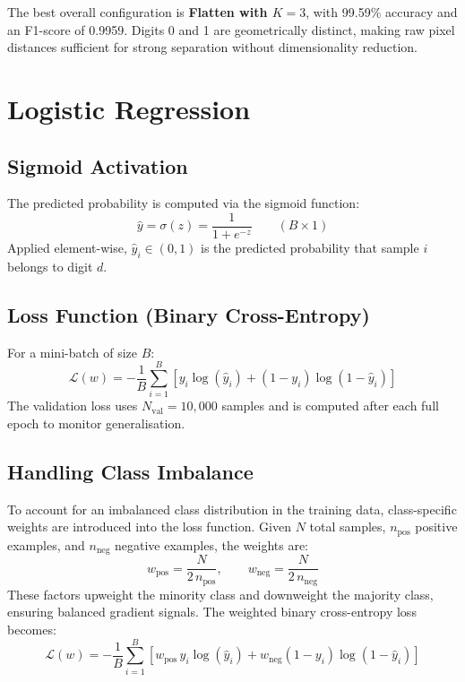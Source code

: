 \documentclass[11pt,a4paper]{article}
\begin{document}
The best overall configuration is \textbf{Flatten with $K=3$}, with 99.59\% accuracy and an F1-score of 0.9959. Digits 0 and 1 are geometrically distinct, making raw pixel distances sufficient for strong separation without dimensionality reduction.

\newpage

\section{Logistic Regression}

\subsection{Sigmoid Activation}

The predicted probability is computed via the sigmoid function:
\[
\hat{y} = \sigma(z) = \frac{1}{1 + e^{-z}} \qquad (B \times 1)
\]
Applied element-wise, $\hat{y}_i \in (0,1)$ is the predicted probability that sample $i$ belongs to digit $d$.

\subsection{Loss Function (Binary Cross-Entropy)}
For a mini-batch of size $B$:
\[
\mathcal{L}(w) = -\frac{1}{B} \sum_{i=1}^{B} \left[ y_i \log(\hat{y}_i) + (1 - y_i)\log(1 - \hat{y}_i) \right]
\]
The validation loss uses $N_{\text{val}} = 10{,}000$ samples and is computed after each full epoch to monitor generalisation.

\subsection{Handling Class Imbalance}
To account for an imbalanced class distribution in the training data, class-specific weights are introduced into the loss function. Given $N$ total samples, $n_{\text{pos}}$ positive examples, and $n_{\text{neg}}$ negative examples, the weights are:
\[
w_{\text{pos}} = \frac{N}{2\, n_{\text{pos}}}, \qquad w_{\text{neg}} = \frac{N}{2\, n_{\text{neg}}}
\]
These factors upweight the minority class and downweight the majority class, ensuring balanced gradient signals. The weighted binary cross-entropy loss becomes:
\[
\mathcal{L}(w) = -\frac{1}{B} \sum_{i=1}^{B} \left[ w_{\text{pos}}\, y_i \log(\hat{y}_i) + w_{\text{neg}}(1 - y_i)\log(1 - \hat{y}_i) \right]
\]
\end{document}
